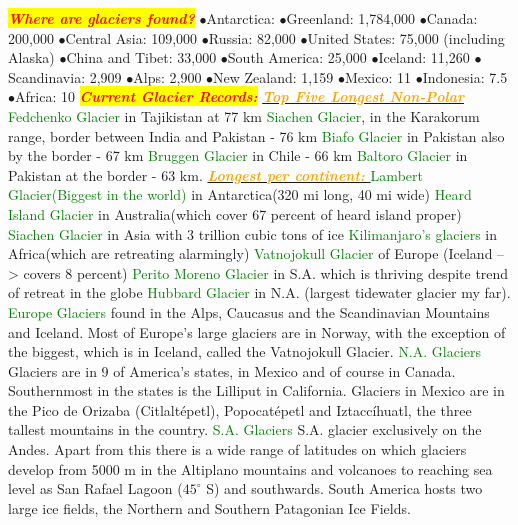 \documentclass{article}
\newcommand{\ddd}{$\bullet$}
\newcommand{\red}[1]{\textcolor{red}{#1}}
\newcommand{\green}[1]{\textcolor{green}{#1}}
\newcommand{\pink}[1]{\textcolor{magenta}{#1}}
\newcommand{\orange}[1]{\textcolor{orange}{#1}}
\newcommand{\mysection}[1]{\colorbox{yellow}{\textbf{\textit{\red{#1}}}}}
\newcommand{\mysub}[1]{\underline{\textbf{{\textit{\orange{#1}}}}}}
\newcommand{\mysubsub}[1]{{{\green{#1}}}}
\begin{document}
\begin{multicols*}{4}
        \pagebreak
        \mysection{Where are glaciers found?}
            \ddd Antarctica:	\pink{ }
            \ddd Greenland:	1,784,000
            \ddd Canada: 200,000
            \ddd Central Asia:	109,000
            \ddd Russia:	82,000
            \ddd United States:	75,000 (including Alaska)
            \ddd China and Tibet:	33,000
            \ddd South America: 25,000
            \ddd Iceland:	11,260
            \ddd Scandinavia:	2,909
            \ddd Alps: 2,900
            \ddd New Zealand:	1,159
            \ddd Mexico: 11
            \ddd Indonesia:	7.5
            \ddd Africa: 10
		\mysection{Current Glacier Records:} 
		    \mysub{Top Five Longest Non-Polar}
		    \mysubsub {Fedchenko Glacier} in Tajikistan at 77 km
		    \mysubsub {Siachen Glacier}, in the Karakorum range, border between India and Pakistan - 76 km
		    \mysubsub {Biafo Glacier} in Pakistan also by the border - 67 km
		    \mysubsub {Bruggen Glacier} in Chile - 66 km
		    \mysubsub {Baltoro Glacier} in Pakistan at the border - 63 km. \mysub{Longest per continent: } 
		    \mysubsub {Lambert Glacier(Biggest in the world)} in Antarctica(320 mi long, 40 mi wide)
		    \mysubsub {Heard Island Glacier} in Australia(which cover 67 percent of heard island proper)
		    \mysubsub {Siachen Glacier} in Asia with 3 trillion cubic tons of ice
		    \mysubsub {Kilimanjaro's glaciers} in Africa(which are retreating alarmingly)
		    \mysubsub {Vatnojokull Glacier} of Europe (Iceland --> covers 8 percent)
		    \mysubsub {Perito Moreno Glacier} in S.A. which is thriving despite trend of retreat in the globe
		    \mysubsub {Hubbard Glacier} in N.A. (largest tidewater glacier my far). 
		    \mysubsub{Europe Glaciers} found in the Alps, Caucasus and the Scandinavian Mountains and Iceland. Most of Europe's large glaciers are in Norway, with the exception of the biggest, which is in Iceland, called the Vatnojokull Glacier.
		    \mysubsub{N.A. Glaciers} Glaciers are in 9 of America's states, in Mexico and of course in Canada. Southernmost in the states is the Lilliput in California. Glaciers in Mexico are in the Pico de Orizaba (Citlaltépetl), Popocatépetl and Iztaccíhuatl, the three tallest mountains in the country.
		    \mysubsub{S.A. Glaciers} S.A. glacier exclusively on the Andes. Apart from this there is a wide range of latitudes on which glaciers develop from 5000 m in the Altiplano mountains and volcanoes to reaching sea level as San Rafael Lagoon ($ 45^\circ $ S) and southwards. South America hosts two large ice fields, the Northern and Southern Patagonian Ice Fields.

\end{multicols*}
\end{document}
